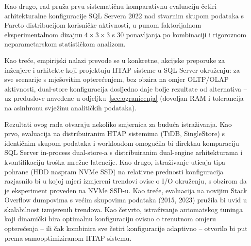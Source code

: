 Kao drugo, rad pruža prvu sistematičnu komparativnu evaluaciju četiri arhitekturalne konfiguracije SQL Servera 2022 nad stvarnim skupom podataka s Pareto distribucijom korisničke aktivnosti, u punom faktorijalnom eksperimentalnom dizajnu $4 \times 3 \times 3$ s 30 ponavljanja po kombinaciji i rigoroznom neparametarskom statističkom analizom.

Kao treće, empirijski nalazi prevode se u konkretne, akcijske preporuke za inženjere i arhitekte koji projektuju HTAP sisteme u SQL Server okruženju: za sve scenarije s mješovitim opterećenjem, bez obzira na omjer OLTP/OLAP aktivnosti, dual-store konfiguracija dosljedno daje bolje rezultate od alternativa -- uz preduslove navedene u odjeljku~\ref{sec:ogranicenja} (dovoljan RAM i tolerancija na asinhronu svježinu analitičkih podataka).

Rezultati ovog rada otvaraju nekoliko smjernica za buduća istraživanja. Kao prvo, evaluacija na distribuiranim HTAP sistemima (TiDB, SingleStore) s identičnim skupom podataka i workloadom omogućila bi direktnu komparaciju SQL Server in-process dual-store-a s distribuiranim dual-engine arhitekturama i kvantifikaciju troška mrežne latencije. Kao drugo, istraživanje uticaja tipa pohrane (HDD naspram NVMe SSD) na relativne prednosti konfiguracija razjasnilo bi u kojoj mjeri izmjereni trendovi ovise o I/O okruženju, s obzirom da je eksperiment proveden na NVMe SSD-u. Kao treće, evaluacija na novijim Stack Overflow dumpovima s većim skupovima podataka (2015, 2023) pružila bi uvid u skalabilnost izmjerenih trendova. Kao četvrto, istraživanje automatskog tuninga koji dinamički bira optimalnu konfiguraciju ovisno o trenutnom omjeru opterećenja -- ili čak kombinira sve četiri konfiguracije adaptivno -- otvorilo bi put prema samooptimiziranom HTAP sistemu.
